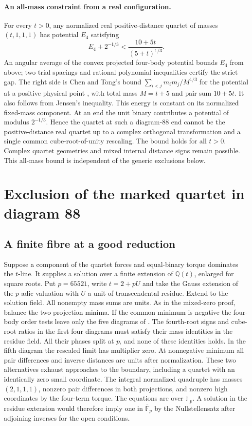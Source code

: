 \documentclass[11pt]{article}
\newcommand{\Q}{\mathbb Q}
\begin{document}
\paragraph{An all-mass constraint from a real configuration.}
For every $t>0$, any normalized real positive-distance quartet of masses $(t,1,1,1)$ has potential $E_4$ satisfying
\[
 E_4+2^{-1/3}<\frac{10+5t}{(5+t)^{1/3}}.
\]
An angular average of the convex projected four-body potential bounds $E_4$ from above; two trial spacings and rational polynomial inequalities certify the strict gap. The right side is Chen and Tong's bound $\sum_{i<j}m_i m_j/M^{1/3}$ for the potential at a positive physical point \cite[proof of Prop.~5.21, following (112)]{CT}, with total mass $M=t+5$ and pair sum $10+5t$. It also follows from Jensen's inequality. This energy is constant on its normalized fixed-mass component. At an end the unit binary contributes a potential of modulus $2^{-1/3}$. Hence the quartet at such a diagram-88 end cannot be the positive-distance real quartet up to a complex orthogonal transformation and a single common cube-root-of-unity rescaling. The bound holds for all $t>0$. Complex quartet geometries and mixed internal distance signs remain possible. This all-mass bound is independent of the generic exclusions below.

\section{Exclusion of the marked quartet in diagram 88}
\subsection{A finite fibre at a good reduction}
Suppose a component of the quartet forces and equal-binary torque dominates the $t$-line. It supplies a solution over a finite extension of $\Q(t)$, enlarged for square roots. Put $p=65521$, write $t=2+pU$ and take the Gauss extension of the $p$-adic valuation with $U$ a unit of transcendental residue. Extend to the solution field. All nonempty mass sums are units. As in the mixed-zero proof, balance the two projection minima. If the common minimum is negative the four-body order tests leave only the five diagrams of \cite[Fig.~8]{AK}. The fourth-root signs and cube-root ratios in the first four diagrams must satisfy their mass identities in the residue field. All their phases split at $p$, and none of these identities holds. In the fifth diagram the rescaled limit has multiplier zero. At nonnegative minimum all pair differences and inverse distances are units after normalization. These two alternatives exhaust approaches to the boundary, including a quartet with an identically zero small coordinate. The integral normalized quadruple has masses $(2,1,1,1)$, nonzero pair differences in both projections, and nonzero high coordinates by the four-term torque. The equations are over $\mathbb F_p$. A solution in the residue extension would therefore imply one in $\overline{\mathbb F}_p$ by the Nullstellensatz after adjoining inverses for the open conditions.
\end{document}
